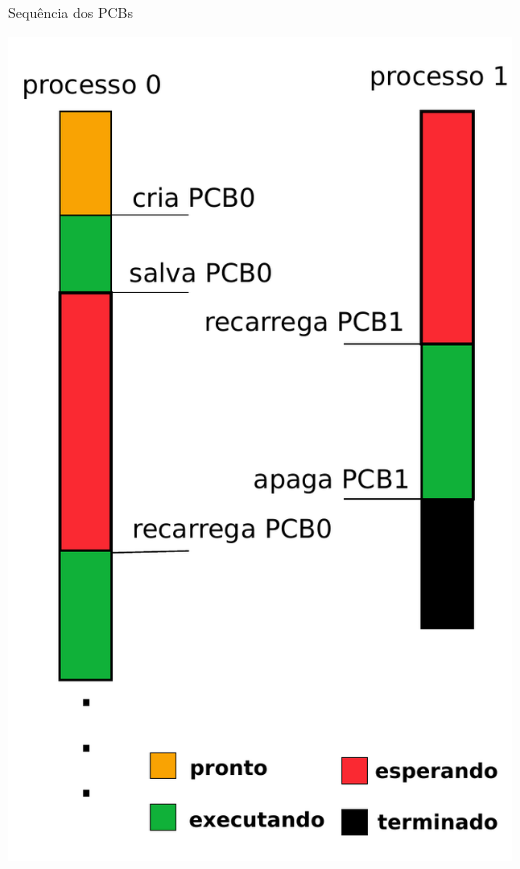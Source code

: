 \begin{frame}{Sequência dos PCBs}

\begin{center}
	\includegraphics[scale=0.45]{pcb-sequence}
\end{center}
\end{frame}


  
